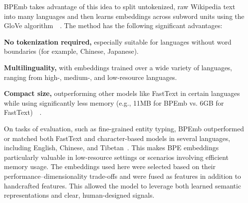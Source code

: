 BPEmb takes advantage of this idea to split untokenized, raw Wikipedia text into many languages and then learns embeddings across subword units using the GloVe algorithm~\cite{bpemb}~\cite{glove}. The method has the following significant advantages:
\begin{compactitem}
\item \textbf{No tokenization required,} especially suitable for languages without word boundaries (for example, Chinese, Japanese).
\item \textbf{Multilinguality,} with embeddings trained over a wide variety of languages, ranging from high-, medium-, and low-resource languages.
\item \textbf{Compact size,} outperforming other models like FastText in certain languages while using significantly less memory (e.g., 11MB for BPEmb vs. 6GB for FastText)~\cite{bpemb}~\cite{bojanowski-enriching}.
\end{compactitem}
On tasks of evaluation, such as fine-grained entity typing, BPEmb outperformed or matched both FastText and character-based models in several languages, including English, Chinese, and Tibetan~\cite{bpemb}. This makes BPE embeddings particularly valuable in low-resource settings or scenarios involving efficient memory usage.
The embeddings used here were selected based on their performance–dimensionality trade-offs and were fused as features in addition to handcrafted features. This allowed the model to leverage both learned semantic representations and clear, human-designed signals.


